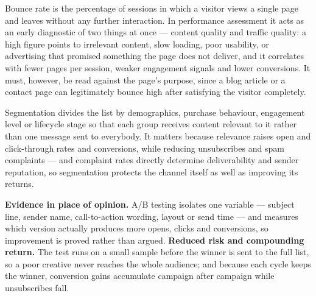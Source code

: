 \begin{qlist}

Bounce rate is the percentage of sessions in which a visitor views a single
page and leaves without any further interaction. In performance assessment it
acts as an early diagnostic of two things at once --- content quality and
traffic quality: a high figure points to irrelevant content, slow loading, poor
usability, or advertising that promised something the page does not deliver,
and it correlates with fewer pages per session, weaker engagement signals and
lower conversions. It must, however, be read against the page's purpose, since
a blog article or a contact page can legitimately bounce high after satisfying
the visitor completely.

Segmentation divides the list by demographics, purchase behaviour, engagement
level or lifecycle stage so that each group receives content relevant to it
rather than one message sent to everybody. It matters because relevance raises
open and click-through rates and conversions, while reducing unsubscribes and
spam complaints --- and complaint rates directly determine deliverability and
sender reputation, so segmentation protects the channel itself as well as
improving its returns.

\textbf{Evidence in place of opinion.} A/B testing isolates one variable ---
subject line, sender name, call-to-action wording, layout or send time --- and
measures which version actually produces more opens, clicks and conversions,
so improvement is proved rather than argued.
\textbf{Reduced risk and compounding return.} The test runs on a small sample
before the winner is sent to the full list, so a poor creative never reaches
the whole audience; and because each cycle keeps the winner, conversion gains
accumulate campaign after campaign while unsubscribes fall.


\end{qlist}
